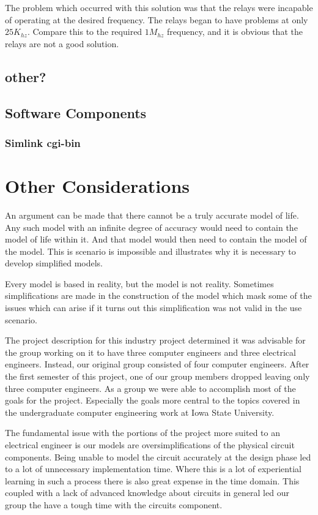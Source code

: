 \documentclass{article}	%
\begin{document}
\begin{multicols}{2}
The problem which occurred with this solution
was that the relays were incapable of
operating at the desired frequency.
The relays began to have problems at only $25K_{hz}$.
Compare this to the required $1M_{hz}$ frequency, and
it is obvious that the relays are not a good solution.

\subsection{other?}

\subsection{Software Components}
\subsubsection{Simlink cgi-bin}


\newpage
\section{Other Considerations}
An argument can be made that there
cannot be a truly accurate model of life.
Any such model with an infinite degree of accuracy
would need to contain the model of life within it.
And that model would then need to contain
the model of the model.
This is scenario is impossible and 
illustrates why it is necessary to develop
simplified models.

Every model is based in reality, but
the model is not reality.
Sometimes simplifications are made in
the construction of the model which mask
some of the issues which can arise if 
it turns out this simplification was
not valid in the use scenario.

The project description for this industry project
determined it was advisable for 
the group working on it to have three computer engineers and
three electrical engineers.
Instead, our original group consisted of four computer engineers.
After the first semester of this project,
one of our group members dropped leaving only three computer engineers.
As a group we were able to accomplish most of the goals for the project.
Especially the goals more central to the topics covered in the
undergraduate computer engineering work at Iowa State University.

The fundamental issue with the portions of the project
more suited to an electrical engineer is
our models are oversimplifications of 
the physical circuit components.
Being unable to model the circuit
accurately at the design phase led to
a lot of unnecessary implementation time.
Where this is a lot of experiential learning in
such a process there is also great expense in the time domain.
This coupled with a lack of advanced knowledge about
circuits in general led our group
the have a tough time with the circuits component.


\end{multicols}
\end{document}
